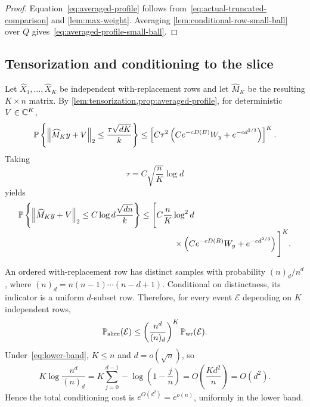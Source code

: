 \begin{proof}
Equation~\eqref{eq:averaged-profile} follows from~\eqref{eq:actual-truncated-comparison} and \cref{lem:max-weight}. Averaging \cref{lem:conditional-row-small-ball} over $Q$ gives~\eqref{eq:averaged-profile-small-ball}.
\end{proof}

\subsection{Tensorization and conditioning to the slice}

Let $\widehat X_1,\ldots,\widehat X_K$ be independent with-replacement rows and let $\widehat M_K$ be the resulting $K\times n$ matrix. By \cref{lem:tensorization,prop:averaged-profile}, for deterministic $V\in\mathbb C^K$,
\begin{equation}\label{eq:profile-tensorization-general}
  \mathbb P\left\{
    \left\|\widehat M_Ky+V\right\|_2
    \le\frac{\tau\sqrt{dK}}{k}
  \right\}
  \le\left[
    C\tau^2\left(Ce^{-cD(B)}W_y+e^{-cd^{2/3}}\right)
  \right]^K.
\end{equation}
Taking
\[
  \tau=C\sqrt{\frac nK}\log d
\]
yields
\begin{equation}\label{eq:profile-tensorization}
  \begin{aligned}
  \mathbb P\left\{
    \left\|\widehat M_Ky+V\right\|_2
    \le C\log d\frac{\sqrt{dn}}{k}
  \right\}
  &\le\Bigg[
    C\frac nK\log^2d\\[-2pt]
  &\hspace{4em}\times
    \left(Ce^{-cD(B)}W_y+e^{-cd^{2/3}}\right)
  \Bigg]^K.
  \end{aligned}
\end{equation}

An ordered with-replacement row has distinct samples with probability $(n)_d/n^d$, where $(n)_d=n(n-1)\cdots(n-d+1)$. Conditional on distinctness, its indicator is a uniform $d$-subset row. Therefore, for every event $\mathcal E$ depending on $K$ independent rows,
\begin{equation}\label{eq:condition-to-slice}
  \mathbb P_{\mathrm{slice}}(\mathcal E)
  \le\left(\frac{n^d}{(n)_d}\right)^K
  \mathbb P_{\mathrm{wr}}(\mathcal E).
\end{equation}
Under~\eqref{eq:lower-band}, $K\le n$ and $d=o(\sqrt n)$, so
\begin{equation}\label{eq:conditioning-cost}
  K\log\frac{n^d}{(n)_d}
  =K\sum_{j=0}^{d-1}-\log\left(1-\frac jn\right)
  =O\left(\frac{Kd^2}{n}\right)
  =O(d^2).
\end{equation}
Hence the total conditioning cost is $e^{O(d^2)}=e^{o(n)}$, uniformly in the lower band.

